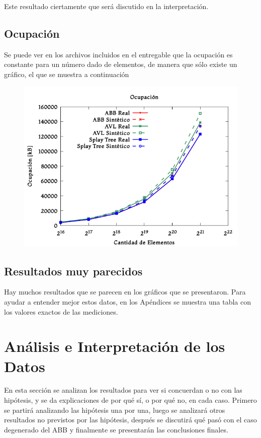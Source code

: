 \documentclass[12pt,letterpaper]{report}
\begin{document}
Este resultado ciertamente que será discutido en la interpretación.

\subsection{Ocupación}
\label{subsec:res_ocupacion}

Se puede ver en los archivos incluidos en el entregable que la ocupación es constante para un número dado de elementos, de manera que sólo existe un gráfico, el que se muestra a continuación

\begin{figure}[H]
\begin{center}
\includegraphics[scale=0.65]{ocupacion.png}
\end{center}
\end{figure}

\subsection{Resultados muy parecidos}
\label{subsec:res_parecidos}

Hay muchos resultados que se parecen en los gráficos que se presentaron. Para ayudar a entender mejor estos datos, en los Apéndices se muestra una tabla con los valores exactos de las mediciones.

\newpage
\section{Análisis e Interpretación de los Datos}
En esta sección se analizan los resultados para ver si concuerdan o no con las hipótesis, y se da explicaciones de por qué sí, o por qué no, en cada caso. Primero se partirá analizando las hipótesis una por una, luego se analizará otros resultados no previstos por las hipótesis, después se discutirá qué pasó con el caso degenerado del ABB y finalmente se presentarán las conclusiones finales.\\
\end{document}
